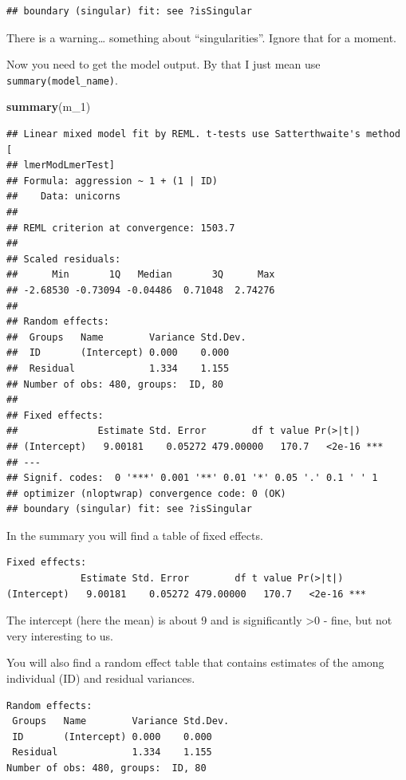 \documentclass[
  12pt,
]{book}
\newenvironment{Shaded}{\begin{snugshade}}{\end{snugshade}}
\newcommand{\DecValTok}[1]{\textcolor[rgb]{0.00,0.00,0.81}{#1}}
\newcommand{\KeywordTok}[1]{\textcolor[rgb]{0.13,0.29,0.53}{\textbf{#1}}}
\newcommand{\NormalTok}[1]{#1}
\begin{document}
\begin{verbatim}
## boundary (singular) fit: see ?isSingular
\end{verbatim}

There is a warning\ldots{} something about ``singularities''. Ignore that for a moment.

Now you need to get the model output. By that I just mean use \texttt{summary(model\_name)}.

\begin{Shaded}
\begin{Highlighting}[]
\KeywordTok{summary}\NormalTok{(m_}\DecValTok{1}\NormalTok{)}
\end{Highlighting}
\end{Shaded}

\begin{verbatim}
## Linear mixed model fit by REML. t-tests use Satterthwaite's method [
## lmerModLmerTest]
## Formula: aggression ~ 1 + (1 | ID)
##    Data: unicorns
## 
## REML criterion at convergence: 1503.7
## 
## Scaled residuals: 
##      Min       1Q   Median       3Q      Max 
## -2.68530 -0.73094 -0.04486  0.71048  2.74276 
## 
## Random effects:
##  Groups   Name        Variance Std.Dev.
##  ID       (Intercept) 0.000    0.000   
##  Residual             1.334    1.155   
## Number of obs: 480, groups:  ID, 80
## 
## Fixed effects:
##              Estimate Std. Error        df t value Pr(>|t|)    
## (Intercept)   9.00181    0.05272 479.00000   170.7   <2e-16 ***
## ---
## Signif. codes:  0 '***' 0.001 '**' 0.01 '*' 0.05 '.' 0.1 ' ' 1
## optimizer (nloptwrap) convergence code: 0 (OK)
## boundary (singular) fit: see ?isSingular
\end{verbatim}

In the summary you will find a table of fixed effects.

\begin{verbatim}
Fixed effects:
             Estimate Std. Error        df t value Pr(>|t|)    
(Intercept)   9.00181    0.05272 479.00000   170.7   <2e-16 ***
\end{verbatim}

The intercept (here the mean) is about 9 and is significantly \textgreater0 - fine, but not very interesting to us.

You will also find a random effect table that contains estimates of the among individual (ID) and residual variances.

\begin{verbatim}
Random effects:
 Groups   Name        Variance Std.Dev.
 ID       (Intercept) 0.000    0.000   
 Residual             1.334    1.155   
Number of obs: 480, groups:  ID, 80
\end{verbatim}
\end{document}
